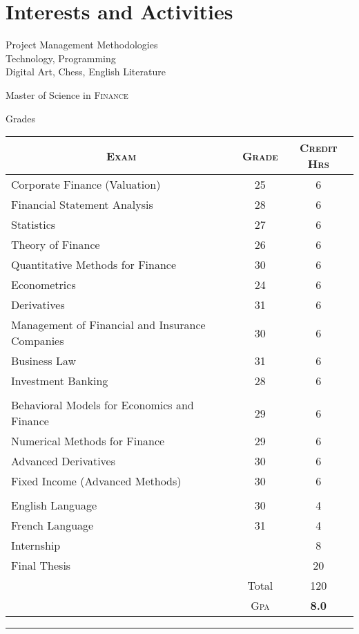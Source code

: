 \documentclass[a4paper,10pt]{article} %
\begin{document}
\section{Interests and Activities}

Project Management Methodologies\\
Technology, Programming\\
Digital Art, Chess, English Literature


\newpage


\par{\centering\Large \hypertarget{grds}{Master of Science in \textsc{Finance}}\par}\large{\centering Grades\par}\normalsize

\begin{center}
\begin{tabular}{lcc}
\multicolumn{1}{c}{\textsc{Exam}} & \textsc{Grade}&\textsc{Credit Hrs}\\ \hline
Corporate Finance (Valuation) & 25 & 6\\
Financial Statement Analysis & 28 & 6\\
Statistics & 27 & 6\\
Theory of Finance & 26 & 6\\
Quantitative Methods for Finance & 30 & 6\\
Econometrics & 24 & 6\\
Derivatives & 31 & 6\\
Management of Financial and Insurance Companies & 30 & 6\\
Business Law & 31 & 6\\
Investment Banking	& 28 & 6\\ \\		
Behavioral Models for Economics and Finance	 & 29 & 6\\
Numerical Methods for Finance & 29 & 6\\
Advanced Derivatives & 30 & 6\\
Fixed Income (Advanced Methods) & 30 & 6\\ \\
English Language & 30 &	4\\
French Language & 31 &	4\\	
Internship & & 8\\		
Final Thesis & & 20\\	
& Total & 120\\\cline{2-3}
&\textsc{Gpa}&\textbf{8.0}
\end{tabular}
\end{center}
\bigskip
\hrule
\bigskip
\end{document}
